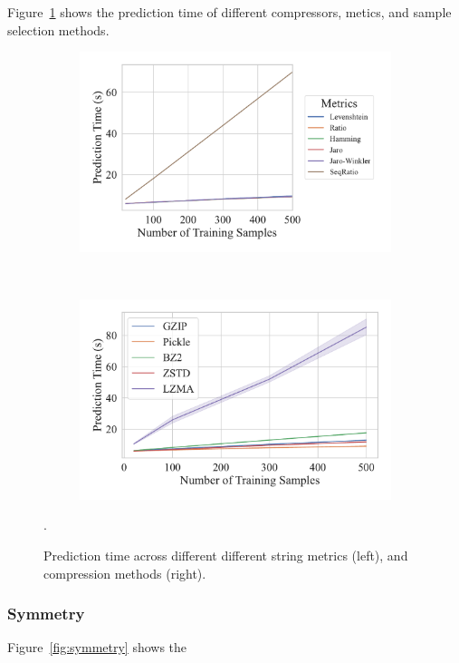 Figure~\ref{fig:prediction_time} shows the prediction time of different compressors, metics, and sample selection methods.
\begin{figure}
	\begin{subfigure}
		\centering
		\includegraphics[width=.46\textwidth]{figs/truthseeker/string_metric_vs_predict_time.pdf}
	\end{subfigure}
	~
	\begin{subfigure}
		\centering
		\includegraphics[width=.46\textwidth]{figs/truthseeker/compressor_metric_vs_predict_time.pdf}
	\end{subfigure}
	\caption{Prediction time across different different string metrics (left), and compression methods (right).}.
	\label{fig:prediction_time}
 
\end{figure}

\subsubsection{Symmetry}

Figure~\ref{fig:symmetry} shows the 

